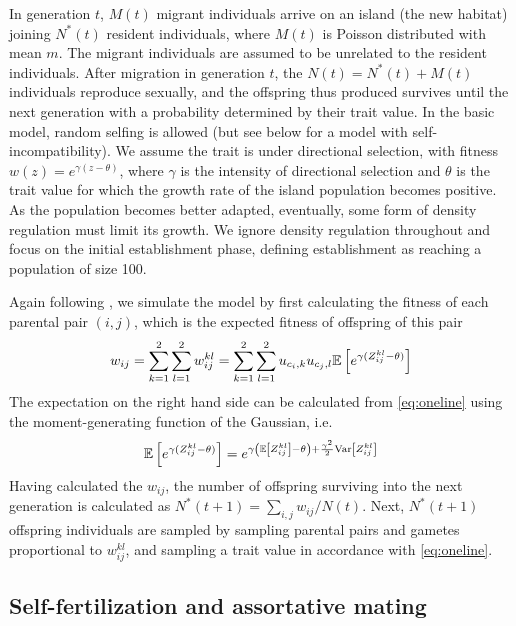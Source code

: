 \documentclass[12pt,a4paper]{article}
\begin{document}
In generation $t$, $M(t)$ migrant individuals arrive on an island (the new
habitat) joining $N^\ast(t)$ resident individuals, where $M(t)$ is Poisson
distributed with mean $m$. 
The migrant individuals are assumed to be unrelated to the resident
individuals.
After migration in generation $t$, the $N(t) = N^\ast(t) + M(t)$ individuals
reproduce sexually, and the offspring thus produced survives until the next
generation with a probability determined by their trait value.
In the basic model, random selfing is allowed (but see below for a model with
self-incompatibility).
We assume the trait is under directional selection, with fitness $w(z) =
e^{\gamma(z - \theta)}$, where $\gamma$ is the intensity of directional
selection and $\theta$ is the trait value for which the growth rate of the
island population becomes positive.
As the population becomes better adapted, eventually, some form of density
regulation must limit its growth.
We ignore density regulation throughout and focus on the initial establishment
phase, defining establishment as reaching a population of size 100.

Again following \cite{barton2018}, we simulate the model by first calculating
the fitness of each parental pair $(i,j)$, which is the expected fitness of
offspring of this pair
\begin{equation}
  w_{ij}
    = \sum_{k=1}^2\sum_{l=1}^2 w_{ij}^{kl}
    = \sum_{k=1}^2\sum_{l=1}^2 u_{c_{i},k}u_{c_{j},l}
        \mathbb{E}\left[e^{\gamma(Z_{ij}^{kl} - \theta)}\right]
\end{equation}
The expectation on the right hand side can be calculated from \cref{eq:oneline}
using the moment-generating function of the Gaussian, i.e.
\begin{equation}
    \mathbb{E}\left[e^{\gamma(Z_{ij}^{kl} - \theta)}\right] 
    = e^{\gamma \left(\mathbb{E} \left[Z_{ij}^{kl}\right] -\theta\right) +
    \frac{\gamma^2}{2}
    \mathrm{Var}\left[Z_{ij}^{kl}\right]} 
\end{equation}
Having calculated the $w_{ij}$, the number of offspring surviving into the next
generation is calculated as $N^\ast(t+1) = \sum_{i,j}w_{ij}/N(t)$.
Next, $N^\ast(t+1)$ offspring individuals are sampled by sampling parental
pairs and gametes proportional to $w_{ij}^{kl}$, and sampling a trait value
in accordance with \cref{eq:oneline}. 


\subsection*{Self-fertilization and assortative mating}
\end{document}
